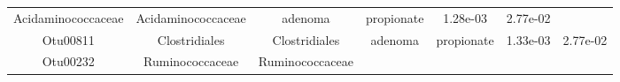 \documentclass[11pt,]{article}
\begin{document}
\begin{longtable}[]{@{}ccccccc@{}}
\begin{minipage}[t]{0.17\columnwidth}
Acidaminococcaceae\strut
\end{minipage} & \begin{minipage}[t]{0.17\columnwidth}\centering\strut
Acidaminococcaceae\strut
\end{minipage} & \begin{minipage}[t]{0.09\columnwidth}\centering\strut
adenoma\strut
\end{minipage} & \begin{minipage}[t]{0.11\columnwidth}\centering\strut
propionate\strut
\end{minipage} & \begin{minipage}[t]{0.09\columnwidth}\centering\strut
1.28e-03\strut
\end{minipage} & \begin{minipage}[t]{0.09\columnwidth}\centering\strut
2.77e-02\strut
\end{minipage}\tabularnewline
\begin{minipage}[t]{0.09\columnwidth}\centering\strut
Otu00811\strut
\end{minipage} & \begin{minipage}[t]{0.17\columnwidth}\centering\strut
Clostridiales\strut
\end{minipage} & \begin{minipage}[t]{0.17\columnwidth}\centering\strut
Clostridiales\strut
\end{minipage} & \begin{minipage}[t]{0.09\columnwidth}\centering\strut
adenoma\strut
\end{minipage} & \begin{minipage}[t]{0.11\columnwidth}\centering\strut
propionate\strut
\end{minipage} & \begin{minipage}[t]{0.09\columnwidth}\centering\strut
1.33e-03\strut
\end{minipage} & \begin{minipage}[t]{0.09\columnwidth}\centering\strut
2.77e-02\strut
\end{minipage}\tabularnewline
\begin{minipage}[t]{0.09\columnwidth}\centering\strut
Otu00232\strut
\end{minipage} & \begin{minipage}[t]{0.17\columnwidth}\centering\strut
Ruminococcaceae\strut
\end{minipage} & \begin{minipage}[t]{0.17\columnwidth}\centering\strut
Ruminococcaceae\strut
\end{minipage} & \begin{minipage}[t]{0.09\columnwidth}\centering\strut

\end{minipage}
\end{longtable}
\end{document}
